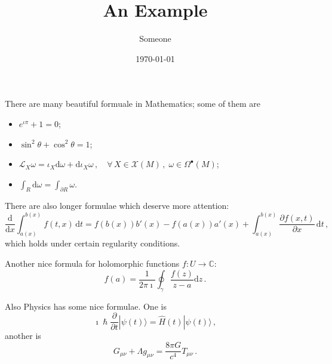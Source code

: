 \documentclass[a4paper]{article}
\title{An Example}
\author{Someone}
\date{\today}
\begin{document}
\maketitle

There are many beautiful formuale in Mathematics; some of them are
\begin{itemize}
    \item $e^{\iota\pi} + 1 = 0$;
    \item $\sin^2 \theta + \cos^2 \theta = 1$;
    \item $\mathcal{L}_X \omega = \iota_X\mathrm{d}\omega + \mathrm{d}\iota_X \omega \,, \quad \forall\, X \in \mathcal{X}(M)\,,\; \omega \in \Omega^\bullet(M)$;
    \item $\int_R \mathrm{d}\omega = \int_{\partial R} \omega$.
\end{itemize}

There are also longer formulae which deserve more attention:
$$
\frac{\mathrm{d}}{\mathrm{d}x} \int_{a(x)}^{b(x)} f(t, x)\, \mathrm{d}t = f(b(x))b'(x) - f(a(x))a'(x) + \int_{a(x)}^{b(x)}\frac{\partial f(x, t)}{\partial x}\, \mathrm{d}t\,,
$$
which holds under certain regularity conditions.

Another nice formula  for holomorphic functions $f: U \rightarrow \mathbb{C}$:
$$
f(a) = \frac{1}{2\pi\imath} \oint_\gamma \frac{f(z)}{z-a}\mathrm{d}z\,.
$$

Also Physics has some nice formulae. One is
$$
\imath\hslash\frac{\partial}{\partial t} |\psi(t)\rangle = \widehat{H}(t)|\psi(t)\rangle \,,
$$
another is
$$
G_{\mu\nu} + \Lambda g_{\mu\nu} = \frac{8\pi G}{c^4}T_{\mu\nu}\,.
$$
\end{document}
